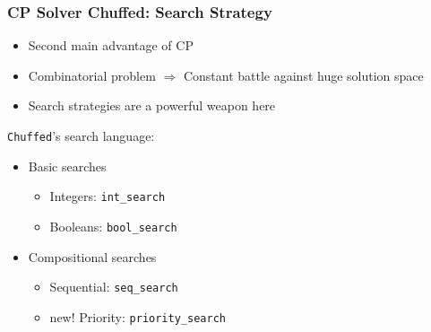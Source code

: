 \documentclass{beamer}
\begin{document}
\begin{frame}
\frametitle{CP Solver Chuffed: Search Strategy}
\begin{itemize}
	\item Second main advantage of CP
	\item Combinatorial problem $\Rightarrow$ Constant battle against huge solution space\vspace{1mm}\pause
	\item Search strategies are a powerful weapon here\pause
\end{itemize}
\vspace{3mm}
{\tt Chuffed}'s search language:\vspace{2mm}\pause
\begin{itemize}
	\item Basic searches\vspace{1mm}
	\begin{itemize}
		\item Integers: {\tt int\_search}\vspace{1mm}
		\item Booleans: {\tt bool\_search}\vspace{2mm}\pause
	\end{itemize}
	\item Compositional searches\vspace{1mm}
	\begin{itemize}
		\item Sequential: {\tt seq\_search}\vspace{1mm}\pause
		\item {\color{red} new!} Priority: {\tt priority\_search}
	\end{itemize}
\end{itemize}
\end{frame}
\end{document}
